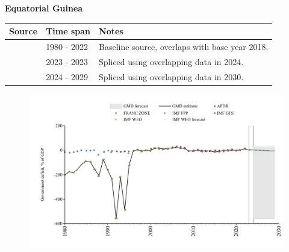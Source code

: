 \documentclass[12pt,a4paper,landscape]{article}
\begin{document}
\begin{adjustbox}{max totalsize={\paperwidth}{\paperheight},center}
\begin{minipage}[t][\textheight][t]{\textwidth}
\vspace*{0.5cm}
{}
\begin{center}
{\Large\bfseries Equatorial Guinea}
\end{center}
\vspace{0.5cm}
\begin{table}[H]
\centering
\small
\begin{tabular}{|l|l|l|}
\hline
\textbf{Source} & \textbf{Time span} & \textbf{Notes} \\
\hline
\rowcolor{white}\cite{IMF_WEO}& 1980 - 2022 &Baseline source, overlaps with base year 2018.\\
\rowcolor{lightgray}\cite{IMF_FPP}& 2023 - 2023 &Spliced using overlapping data in 2024.\\
\rowcolor{white}\cite{IMF_WEO_forecast}& 2024 - 2029 &Spliced using overlapping data in 2030.\\
\hline
\end{tabular}
\end{table}
\begin{figure}[H]
\centering
\includegraphics[width=\textwidth,height=0.6\textheight,keepaspectratio]{graphs/GNQ_govdef_GDP.pdf}
\end{figure}
\end{minipage}
\end{adjustbox}
\end{document}
